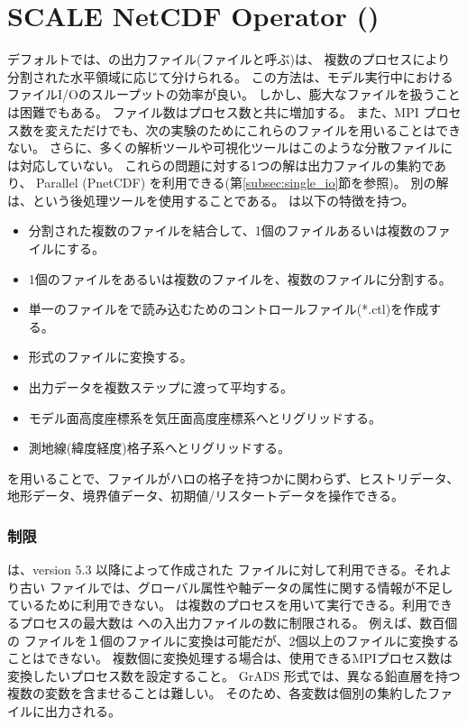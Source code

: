 \section{SCALE NetCDF Operator (\sno)} \label{sec:snoutil}

デフォルトでは、\scalerm の出力ファイル(\scalenetcdf ファイルと呼ぶ)は、
複数のプロセスにより分割された水平領域に応じて分けられる。
この方法は、モデル実行中におけるファイルI/Oのスループットの効率が良い。
しかし、膨大なファイルを扱うことは困難でもある。
ファイル数はプロセス数と共に増加する。
また、MPI プロセス数を変えただけでも、次の実験のためにこれらのファイルを用いることはできない。
さらに、多くの解析ツールや可視化ツールはこのような分散ファイルには対応していない。
これらの問題に対する1つの解は出力ファイルの集約であり、
Parallel \netcdf (PnetCDF) を利用できる(第\ref{subsec:single_io}節を参照)。
別の解は、\sno という後処理ツールを使用することである。
\sno は以下の特徴を持つ。

\begin{itemize}
 \item 分割された複数のファイルを結合して、1個のファイルあるいは複数のファイルにする。
 \item 1個のファイルをあるいは複数のファイルを、複数のファイルに分割する。
 \item 単一の{\Netcdf}ファイルを{\grads}で読み込むためのコントロールファイル(*.ctl)を作成する。
 \item \grads 形式のファイルに変換する。
 \item 出力データを複数ステップに渡って平均する。
 \item モデル面高度座標系を気圧面高度座標系へとリグリッドする。
 \item 測地線(緯度経度)格子系へとリグリッドする。
\end{itemize}

\sno を用いることで、ファイルがハロの格子を持つかに関わらず、ヒストリデータ、地形データ、境界値データ、初期値/リスタートデータを操作できる。

\subsubsection{制限}

\sno は、\scalelib version 5.3 以降によって作成された \scalenetcdf ファイルに対して利用できる。それより古い \scalenetcdf ファイルでは、グローバル属性や軸データの属性に関する情報が不足しているために利用できない。
\sno は複数のプロセスを用いて実行できる。利用できるプロセスの最大数は \sno への入出力ファイルの数に制限される。
例えば、数百個の \scalenetcdf ファイルを１個のファイルに変換は可能だが、2個以上のファイルに変換することはできない。
複数個に変換処理する場合は、使用できるMPIプロセス数は変換したいプロセス数を設定すること。
GrADS 形式では、異なる鉛直層を持つ複数の変数を含ませることは難しい。
そのため、各変数は個別の集約したファイルに出力される。

